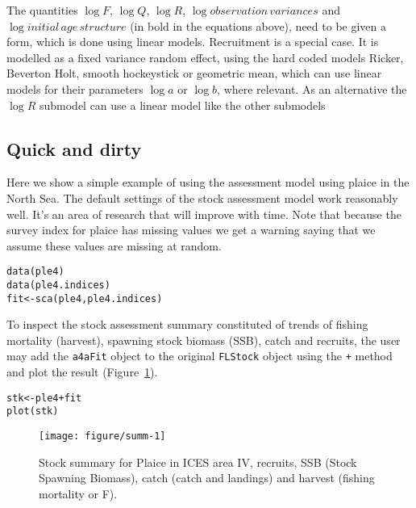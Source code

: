 \documentclass[a4paper,english,10pt]{article}\usepackage[]{graphicx}\usepackage[]{color}
\makeatletter
\def\maxwidth{ %
  \ifdim\Gin@nat@width>\linewidth
    \linewidth
  \else
    \Gin@nat@width
  \fi
}
\newcommand{\hlopt}[1]{\textcolor[rgb]{0.2,0.2,0.2}{#1}}%
\newcommand{\hlstd}[1]{\textcolor[rgb]{0,0,0}{#1}}%
\newcommand{\hlkwb}[1]{\textcolor[rgb]{0.361,0.506,0.596}{#1}}%
\newcommand{\hlkwd}[1]{\textcolor[rgb]{0.361,0.506,0.596}{#1}}%
\newenvironment{kframe}{%
 \def\at@end@of@kframe{}%
 \ifinner\ifhmode%
  \def\at@end@of@kframe{\end{minipage}}%
  \begin{minipage}{\columnwidth}%
 \fi\fi%
 \def\FrameCommand##1{\hskip\@totalleftmargin \hskip-\fboxsep
 \colorbox{shadecolor}{##1}\hskip-\fboxsep
     \hskip-\linewidth \hskip-\@totalleftmargin \hskip\columnwidth}%
 \MakeFramed {\advance\hsize-\width
   \@totalleftmargin\z@ \linewidth\hsize
   \@setminipage}}%
 {\par\unskip\endMakeFramed%
 \at@end@of@kframe}
\newenvironment{knitrout}{}{} %
\newcommand{\code}[1]{{\texttt{#1}}}
\makeatother
\begin{document}
The quantities $\log{F}$, $\log{Q}$, $\log{R}$, $\log{observation\,variances}$ and $\log{ initial\,age\,structure}$ (in bold in the equations above), need to be given a form, which is done using linear models. Recruitment is a special case. It is modelled as a fixed variance random effect, using the hard coded models Ricker, Beverton Holt, smooth hockeystick or geometric mean, which can use linear models for their parameters $\log{a}$ or $\log{b}$, where relevant. As an alternative the $\log{R}$ submodel can use a linear model like the other submodels 

\subsection{Quick and dirty}

Here we show a simple example of using the assessment model using plaice in the North Sea. The default settings of the stock assessment model work reasonably well. It's an area of research that will improve with time. Note that because the survey index for plaice has missing values we get a warning saying that we assume these values are missing at random.

\begin{knitrout}
\color{fgcolor}\begin{kframe}
\begin{alltt}
\hlkwd{data}\hlstd{(ple4)}
\hlkwd{data}\hlstd{(ple4.indices)}
\hlstd{fit} \hlkwb{<-} \hlkwd{sca}\hlstd{(ple4, ple4.indices)}
\end{alltt}
\end{kframe}
\end{knitrout}

To inspect the stock assessment summary constituted of trends of fishing mortality (harvest), spawning stock biomass (SSB), catch and recruits, the user may add the \code{a4aFit} object to the original \code{FLStock} object using the \code{+} method and plot the result (Figure~\ref{fig:summ}).

\begin{knitrout}
\color{fgcolor}\begin{kframe}
\begin{alltt}
\hlstd{stk} \hlkwb{<-} \hlstd{ple4} \hlopt{+} \hlstd{fit}
\hlkwd{plot}\hlstd{(stk)}
\end{alltt}
\end{kframe}\begin{figure}[H]

{\centering \texttt{[image: figure/summ-1]} 

}

\caption[Stock summary for Plaice in ICES area IV, recruits, SSB (Stock Spawning Biomass), catch (catch and landings) and harvest (fishing mortality or F)]{Stock summary for Plaice in ICES area IV, recruits, SSB (Stock Spawning Biomass), catch (catch and landings) and harvest (fishing mortality or F).\label{fig:summ}}
\end{figure}


\end{knitrout}
\end{document}

